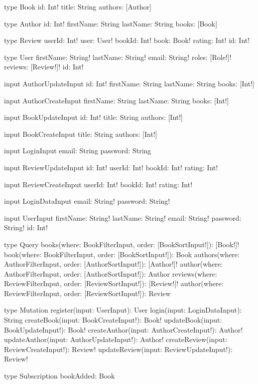 \begin{JsCode}
type Book {
    id: Int!
    title: String
    authors: [Author]
}
    
type Author {
    id: Int!
    firstName: String
    lastName: String
    books: [Book]
}
    
type Review {
    userId: Int!
    user: User!
    bookId: Int!
    book: Book!
    rating: Int!
    id: Int!
}
    
type User {
    firstName: String!
    lastName: String!
    email: String!
    roles: [Role!]!
    reviews: [Review!]!
    id: Int!
}
    
input AuthorUpdateInput {
    id: Int!
    firstName: String
    lastName: String
    books: [Int!]
}
    
input AuthorCreateInput {
    firstName: String
    lastName: String
    books: [Int!]
}
    
input BookUpdateInput {
    id: Int!
    title: String
    authors: [Int!]
}
    
input BookCreateInput {
    title: String
    authors: [Int!]
}
    
input LoginInput {
    email: String
    password: String
}
    
input ReviewUpdateInput {
    id: Int!
    userId: Int!
    bookId: Int!
    rating: Int!
}
    
input ReviewCreateInput {
    userId: Int!
    bookId: Int!
    rating: Int!
}
    
input LoginDataInput {
    email: String!
    password: String!
}
    
input UserInput {
    firstName: String!
    lastName: String!
    email: String!
    password: String!
    id: Int!
}
    
type Query {
    books(where: BookFilterInput, order: [BookSortInput!]): [Book!]!
    book(where: BookFilterInput, order: [BookSortInput!]): Book
    authors(where: AuthorFilterInput, order: [AuthorSortInput!]): [Author!]!
    author(where: AuthorFilterInput, order: [AuthorSortInput!]): Author
    reviews(where: ReviewFilterInput, order: [ReviewSortInput!]): [Review!]!
    author(where: ReviewFilterInput, order: [ReviewSortInput!]): Review
}
    
type Mutation {
    register(input: UserInput): User
    login(input: LoginDataInput): String
    createBook(input: BookCreateInput!): Book!
    updateBook(input: BookUpdateInput!): Book!
    createAuthor(input: AuthorCreateInput!): Author!
    updateAuthor(input: AuthorUpdateInput!): Author!
    createReview(input: ReviewCreateInput!): Review!
    updateReview(input: ReviewUpdateInput!): Review!
}
    
type Subscription {
    bookAdded: Book
}
\end{JsCode}

